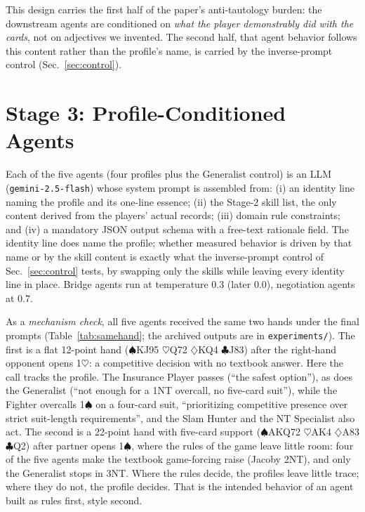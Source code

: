 \documentclass[11pt,a4paper]{article}
\begin{document}
This design carries the first half of the paper's anti-tautology
burden: the downstream agents are conditioned on \emph{what the player
demonstrably did with the cards}, not on adjectives we invented. The
second half, that agent behavior follows this content rather than the
profile's name, is carried by the inverse-prompt control
(Sec.~\ref{sec:control}).

\section{Stage 3: Profile-Conditioned Agents}\label{sec:stage3}

Each of the five agents (four profiles plus the Generalist control) is
an LLM (\texttt{gemini-2.5-flash}) whose system prompt is assembled from: (i) an
identity line naming the profile and its one-line essence; (ii) the
Stage-2 skill list, the only content derived from the players' actual
records; (iii) domain rule constraints; and (iv) a mandatory JSON output
schema with a free-text rationale field. The identity line does name
the profile; whether measured behavior is driven by that name or by the
skill content is exactly what the inverse-prompt control of
Sec.~\ref{sec:control} tests, by swapping only the skills while leaving
every identity line in place. Bridge agents run at temperature 0.3
(later 0.0), negotiation agents at 0.7.

As a \emph{mechanism check}, all five agents received the same two
hands under the final prompts (Table~\ref{tab:samehand}; the archived
outputs are in \texttt{experiments/}). The first is a flat 12-point
hand ($\spadesuit$KJ95 $\heartsuit$Q72 $\diamondsuit$KQ4
$\clubsuit$J83) after the right-hand opponent opens 1$\heartsuit$: a
competitive decision with no textbook answer. Here the call tracks the
profile. The Insurance Player passes (``the safest option''), as does
the Generalist (``not enough for a 1NT overcall, no five-card suit''),
while the Fighter overcalls 1$\spadesuit$ on a four-card suit,
``prioritizing competitive presence over strict suit-length
requirements'', and the Slam Hunter and the NT Specialist also act.
The second is a 22-point hand with five-card support ($\spadesuit$AKQ72
$\heartsuit$AK4 $\diamondsuit$A83 $\clubsuit$Q2) after partner opens
1$\spadesuit$, where the rules of the game leave little room: four of
the five agents make the textbook game-forcing raise (Jacoby 2NT), and
only the Generalist stops in 3NT. Where the rules decide, the profiles
leave little trace; where they do not, the profile decides. That is
the intended behavior of an agent built as rules first, style second.
\end{document}
